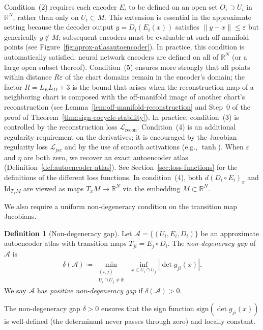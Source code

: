 \documentclass[11pt]{article}
\newcommand{\R}{\mathbb{R}}
\newcommand{\sign}{\mathrm{sign}}
\theoremstyle{plain}
\theoremstyle{definition}
\newtheorem{definition}[theorem]{Definition}
\theoremstyle{remark}
\begin{document}
Condition~(2) requires each encoder $E_i$ to be defined on an open set $O_i \supset U_i$ in $\R^N$, rather than only on $U_i \subset M$. This extension is essential in the approximate setting because the decoder output $y = D_i(E_i(x))$ satisfies $\|y - x\| \leq \varepsilon$ but generically $y \notin M$; subsequent encoders must be evaluable at such off-manifold points (see Figure~\ref{fig:aprox-atlasautoencoder}). In practice, this condition is automatically satisfied: neural network encoders are defined on all of $\R^N$ (or a large open subset thereof). Condition~(5) ensures more strongly that all points within distance $R\varepsilon$ of the chart domains remain in the encoder's domain; the factor $R = L_E L_D + 3$ is the bound that arises when the reconstruction map of a neighboring chart is composed with the off-manifold image of another chart's reconstruction (see Lemma~\ref{lem:off-manifold-reconstruction} and Step~0 of the proof of Theorem~\ref{thm:sign-cocycle-stability}). In practice, condition~(3) is controlled by the reconstruction loss $\mathcal{L}_{\mathrm{recon}}$. Condition~(4) is an additional regularity requirement on the derivatives; it is encouraged by the Jacobian regularity loss $\mathcal{L}_{\mathrm{jac}}$ and by the use of smooth activations (e.g., $\tanh$). When $\varepsilon$ and $\eta$ are both zero, we recover an exact autoencoder atlas (Definition~\ref{def:autoencoder-atlas}). See Section~\ref{sec:loss-functions} for the definitions of the different loss functions. In condition~(4), both $d(D_i\circ E_i)_x$ and $\mathrm{Id}_{T_xM}$ are viewed as maps $T_xM \to \mathbb{R}^N$ via the embedding $M \subset \mathbb{R}^N$.

We also require a uniform non-degeneracy condition on the transition map Jacobians.

\begin{definition}[Non-degeneracy gap]\label{def:nondegeneracy}
Let $\mathcal{A} = \{(U_i, E_i, D_i)\}$ be an approximate autoencoder atlas with transition maps $T_{ji} = E_j \circ D_i$. The \emph{non-degeneracy gap} of $\mathcal{A}$ is
\[
\delta(\mathcal{A}) \coloneqq \min_{\substack{(i,j) \\ U_i \cap U_j \neq \emptyset}}
\;\inf_{x \in U_i \cap U_j} |\det g_{ji}(x)|.
\]
We say $\mathcal{A}$ has \emph{positive non-degeneracy gap} if $\delta(\mathcal{A}) > 0$.
\end{definition}

The non-degeneracy gap $\delta > 0$ ensures that the sign function $\sign(\det g_{ji}(x))$ is well-defined (the determinant never passes through zero) and locally constant.
\end{document}
